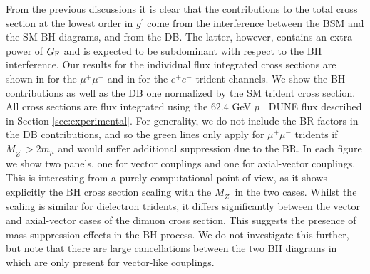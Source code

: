From the previous discussions it is clear that the contributions to the total cross section at the lowest order in $g^\prime$ 
come from the interference between the BSM and the SM BH diagrams, and from the DB. The latter, however, contains an extra power of $G_{\rm F}$ and is expected to be subdominant with respect to the BH interference. Our results for the individual flux integrated cross sections are shown in  for the $\mu^+\mu^-$ and in  for the $e^+e^-$ trident channels. We show the BH contributions as well as the DB one normalized by the SM trident cross section. All cross sections are flux integrated using the $62.4$ GeV $p^+$ DUNE flux described in Section \ref{sec:experimental}. For generality, we do not include the BR factors in the DB contributions, and so the green lines only apply for $\mu^+\mu^-$ tridents if $M_{Z^\prime} > 2 m_\mu$ and would suffer additional suppression due to the BR. In each figure we show two panels, one for vector couplings and one for axial-vector couplings. This is interesting from a purely computational point of view, as it shows explicitly the BH cross section scaling with the $M_{Z^\prime}$ in the two cases. Whilst the scaling is similar for dielectron tridents, it differs significantly between the vector and axial-vector cases of the dimuon cross section. This suggests the presence of mass suppression effects in the BH process. We do not investigate this further, but note that there are large cancellations between the two BH diagrams in  which are only present for vector-like couplings.

